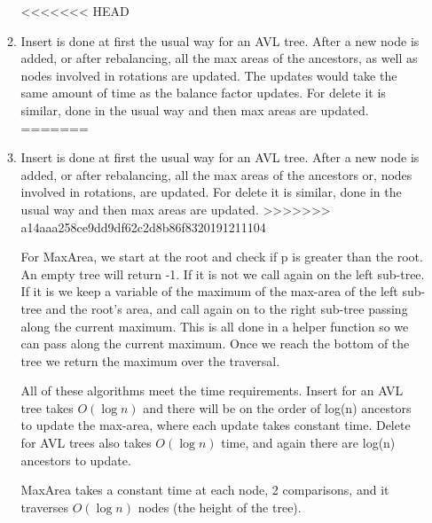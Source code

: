 \documentclass[10pt,a4paper]{article}
\begin{document}
\begin{enumerate}
\begin{enumerate}
<<<<<<< HEAD
\item Insert is done at first the usual way for an AVL tree. After a new node is added, or after rebalancing, all the max areas of the ancestors, as well as nodes involved in rotations are updated. The updates would take the same amount of time as the balance factor updates. For delete it is similar, done in the usual way and then max areas are updated.
=======
\item Insert is done at first the usual way for an AVL tree. After a new node is added, or after rebalancing, all the max areas of the ancestors or, nodes involved in rotations, are updated. For delete it is similar, done in the usual way and then max areas are updated.
>>>>>>> a14aaa258ce9dd9df62c2d8b86f8320191211104

For MaxArea, we start at the root and check if p is greater than the root.  An empty tree will return -1. If it is not we call again on the left sub-tree. If it is we keep a variable of the maximum of the max-area of the left sub-tree and the root's area, and call again on to the right sub-tree passing along the current maximum. This is all done in a helper function so we can pass along the current maximum. Once we reach the bottom of the tree we return the maximum over the traversal.

All of these algorithms meet the time requirements. Insert for an AVL tree takes $O(\log n)$ and there will be on the order of log(n) ancestors to update the max-area, where each update takes constant time. Delete for AVL trees also takes 
$O(\log n)$ time, and again there are log(n) ancestors to update. 

MaxArea takes a constant time at each node, 2 comparisons, and it traverses $O(\log n)$ nodes (the height of the tree).
\end{enumerate}
\end{enumerate}
\end{document}
